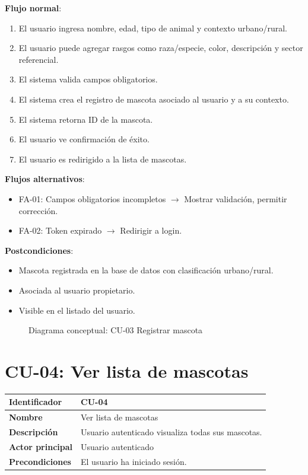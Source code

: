 \documentclass[12pt,a4paper]{article}
\begin{document}
\vspace{0.5em}

\textbf{Flujo normal}:
\begin{enumerate}[leftmargin=*]
    \item El usuario ingresa nombre, edad, tipo de animal y contexto urbano/rural.
    \item El usuario puede agregar rasgos como raza/especie, color, descripci\'on y sector referencial.
    \item El sistema valida campos obligatorios.
    \item El sistema crea el registro de mascota asociado al usuario y a su contexto.
    \item El sistema retorna ID de la mascota.
    \item El usuario ve confirmaci\'on de \'exito.
    \item El usuario es redirigido a la lista de mascotas.
\end{enumerate}

\textbf{Flujos alternativos}:
\begin{itemize}[leftmargin=*]
    \item FA-01: Campos obligatorios incompletos $\rightarrow$ Mostrar validaci\'on, permitir correcci\'on.
    \item FA-02: Token expirado $\rightarrow$ Redirigir a login.
\end{itemize}

\textbf{Postcondiciones}:
\begin{itemize}[leftmargin=*]
    \item Mascota registrada en la base de datos con clasificaci\'on urbano/rural.
    \item Asociada al usuario propietario.
    \item Visible en el listado del usuario.
\end{itemize}

\begin{figure}[h]
\centering
{}
\caption{Diagrama conceptual: CU-03 Registrar mascota}
\end{figure}

\newpage

\section{CU-04: Ver lista de mascotas}

\begin{tabular}{|p{3.5cm}|p{10cm}|}
\hline
\textbf{Identificador} & CU-04 \\
\hline
\textbf{Nombre} & Ver lista de mascotas \\
\hline
\textbf{Descripci\'on} & Usuario autenticado visualiza todas sus mascotas. \\
\hline
\textbf{Actor principal} & Usuario autenticado \\
\hline
\textbf{Precondiciones} & El usuario ha iniciado sesi\'on. \\
\hline
\end{tabular}
\end{document}
